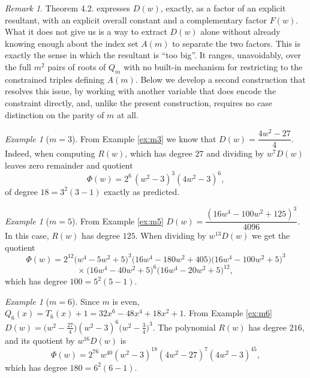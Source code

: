 \documentclass[11pt,reqno]{amsart}
\theoremstyle{remark}
\newtheorem{remark}[theorem]{Remark}
\newtheorem{example}[theorem]{Example}
\begin{document}
\begin{remark}
Theorem 4.2. expresses $D(w)$, exactly, as a factor of an explicit resultant, with an explicit
overall constant and a complementary factor $F(w)$.
What it does not give us is a way to extract $D(w)$ alone without already knowing enough about the
index set $A(m)$ to separate the two factors.
This is exactly the sense in which the resultant is ``too big''.  It
ranges, unavoidably, over the full $m^2$ pairs of roots of $Q_m$ with no built-in mechanism for
restricting to the constrained triples defining $A(m)$. Below we develop a second construction that
resolves this issue, by working with another variable  that does encode the
constraint directly,  and, unlike the present construction, requires no case distinction on the
parity of $m$ at all.
\end{remark}

\begin{example}[$m = 3$]
From Example \ref{ex:m3} we know that $D(w) = \dfrac{4w^2-27}{4}$.  Indeed, when computing $R(w)$, which has
degree $27$ and dividing by
$w^7 D(w)$ leaves zero remainder and quotient
\[
\Phi(w) = 2^6\,(w^2-3)^3(4w^2-3)^6,
\]
of degree $18 = 3^2(3-1)$ exactly as predicted.
\end{example}


\begin{example}[$m = 5$]
From Example \ref{ex:m5} $D(w) = \dfrac{(16w^4-100w^2+125)^3}{4096}$.  In this case, $R(w)$  has degree $125$.
When dividing by $w^{13}D(w)$ we get the quotient
\[
\Phi(w) = 2^{12}\bigl(w^4-5w^2+5\bigr)^3\bigl(16w^4-180w^2+405\bigr)\bigl(16w^4-100w^2+5\bigr)^3
\]
\[
\times\ \bigl(16w^4-40w^2+5\bigr)^6\bigl(16w^4-20w^2+5\bigr)^{12},
\]
which has degree $100 = 5^2(5-1)$.
\end{example}

\begin{example}[$m = 6$]
Since $m$ is even, $Q_6(x) = T_6(x) + 1 = 32x^6-48x^4+18x^2+1$. From Example \ref{ex:m6}
$D(w) = \bigl(w^2-\tfrac{27}{4}\bigr)(w^2-3)^6\bigl(w^2-\tfrac34\bigr)^3$. The polynomial
$R(w)$ has  degree $216$, and its quotient by $w^{16}D(w)$ is
\[
\Phi(w) = 2^{76}\,w^{40}(w^2-3)^{18}(4w^2-27)^7(4w^2-3)^{45},
\]
which has degree $180 = 6^2(6-1)$.
\end{example}
\end{document}
